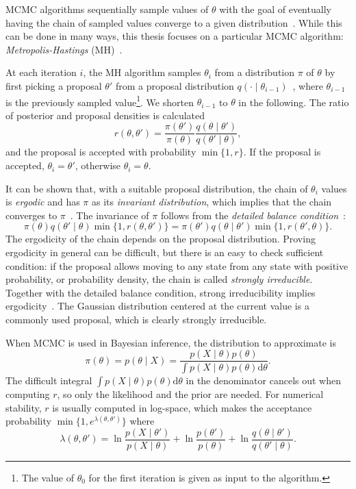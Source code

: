 \documentclass[english,twoside,openright]{HYgraduMLDS}
\newcommand{\dx}{\mathrm{d}}
\begin{document}
MCMC algorithms sequentially sample values of \(\theta\)
with the goal of eventually having the chain of sampled values converge to 
a given distribution~\cite{Robert04}. While this can be done in many ways, this thesis
focuses on a particular MCMC algorithm:
\emph{Metropolis-Hastings} (MH)~\cite{MRR53, Has70}.

At each iteration \(i\), the MH algorithm samples \(\theta_i\)
from a distribution \(\pi\) of \(\theta\)
by first picking a proposal \(\theta'\) from a proposal 
distribution \(q(\cdot \mid \theta_{i-1})\)~\cite{MRR53}, where \(\theta_{i-1}\) is the
previously sampled value\footnote{
    The value of \(\theta_0\) for the first iteration is given as input to the 
    algorithm.
}. We shorten \(\theta_{i-1}\) to \(\theta\) in the following. 
The ratio of posterior and proposal densities is calculated
\[
    r(\theta, \theta') = \frac{\pi(\theta')}{\pi(\theta)}
    \frac{q(\theta\mid \theta')}{q(\theta'\mid \theta)},
\]
and the proposal is accepted with probability \(\min\{1, r\}\). 
If the proposal is accepted, 
\(\theta_i = \theta'\), otherwise \(\theta_i = \theta\).

It can be shown that, with a suitable proposal distribution, the chain of
\(\theta_i\) values is \emph{ergodic} and has \(\pi\) as its \emph{invariant
distribution}, which implies that the chain converges to \(\pi\)~\cite{Has70}.
The invariance of \(\pi\) follows from the \emph{detailed balance condition}~\cite{Robert04}:
\[
  \pi(\theta)q(\theta'\mid \theta)\min\{1, r(\theta, \theta')\}
  = \pi(\theta')q(\theta\mid \theta')\min\{1, r(\theta', \theta)\}.
\]
The ergodicity of the chain depends on the proposal distribution. Proving
ergodicity in general can be difficult, but there is an easy to check
sufficient condition: if the proposal allows moving to any state from any
state with positive probability, or probability density, the chain is called
\emph{strongly irreducible}. Together with the detailed balance condition,
strong irreducibility implies ergodicity~\cite{Robert04}. The Gaussian
distribution centered
at the current value is a commonly used proposal, which is clearly
strongly irreducible.

When MCMC is used in Bayesian inference, the distribution to approximate is 
\[
    \pi(\theta) = p(\theta \mid X) = \frac{p(X \mid \theta)p(\theta)}
    {\int p(X\mid \theta)p(\theta)\dx\theta}.
\]
The difficult integral \(\int p(X\mid \theta)p(\theta)\dx\theta\) in the denominator
cancels out when computing \(r\), so only the likelihood and the prior are needed. 
For numerical stability, \(r\) is usually computed in 
log-space, which makes the acceptance probability
\(\min\{1, e^{\lambda(\theta, \theta')}\}\) where 
\begin{equation}\label{lambda_equation}
    \lambda(\theta, \theta') = \ln \frac{p(X\mid \theta')}{p(X\mid \theta)}
    + \ln \frac{p(\theta')}{p(\theta)}
    + \ln \frac{q(\theta\mid \theta')}{q(\theta'\mid \theta)}.
\end{equation}
\end{document}
